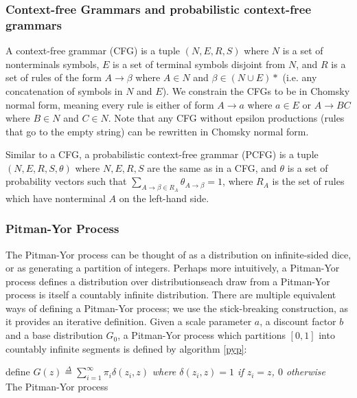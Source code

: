 \documentclass[12pt,letterpaper]{article}
\begin{document}
\subsubsection{Context-free Grammars and probabilistic context-free grammars}
A context-free grammar (CFG) is a tuple $(N, E, R, S)$ where $N$ is a set of nonterminals symbols, $E$ is a set of terminal symbols disjoint from $N$, and $R$ is a set of rules of the form $A \rightarrow \beta$ where $A \in N$ and $\beta \in (N \cup E)*$ (i.e. any concatenation of symbols in $N$ and $E$). We constrain the CFGs to be in Chomsky normal form, meaning every rule is either of form $A \rightarrow a$ where $a \in E$ or $A \rightarrow BC$ where $B\in N$ and $C\in N$. Note that any CFG without epsilon productions (rules that go to the empty string) can be rewritten in Chomsky normal form. \citep{hopcroft:2006}  

Similar to a CFG, a probabilistic context-free grammar (PCFG) is a tuple $(N, E, R, S, \theta)$ where $N,E,R,S$ are the same as in a CFG, and $\theta$ is a set of probability vectors such that $\sum\limits_{A\rightarrow \beta \in R_A} \theta_{A\rightarrow \beta} = 1$, where $R_A$ is the set of rules which have nonterminal $A$ on the left-hand side. 

\subsubsection{Pitman-Yor Process}
The Pitman-Yor process \citep{pitman:1997} can be thought of as a distribution on infinite-sided dice, or as generating a partition of integers. Perhaps more intuitively, a Pitman-Yor process defines a distribution over distributions\textemdash each draw from a Pitman-Yor process is itself a countably infinite distribution. There are multiple equivalent ways of defining a Pitman-Yor process; we use the stick-breaking construction, as it provides an iterative definition. Given a scale parameter $a$, a discount factor $b$ and a base distribution $G_0$, a Pitman-Yor process which partitions $[0,1]$ into countably infinite segments is defined by algorithm \hyperref[pyp]{\ref*{pyp}}:

\begin{algorithm}[H]
define $G(z) \overset{\Delta}{=} \sum\limits_{i=1}^\infty \pi_i \delta(z_i, z)$ \emph{where $\delta(z_i,z) = 1$ if $z_i = z$, $0$ otherwise}\\
\caption{The Pitman-Yor process}
\label{pyp}
\end{algorithm} \citep{sethuraman:1994}
\end{document}
